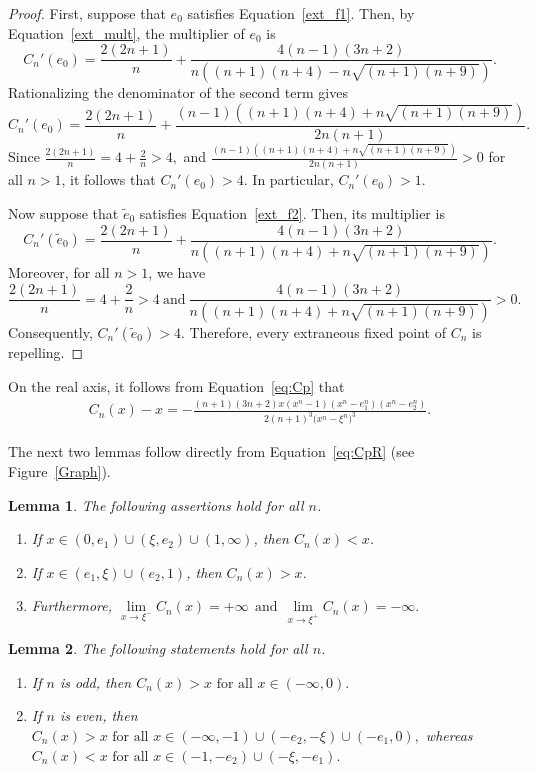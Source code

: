 \documentclass[12pt]{article}
\newtheorem{lem}{Lemma}[section]
\begin{document}
	\begin{proof}
		First, suppose that $e_0$ satisfies Equation~\eqref{ext_f1}.
		Then, by Equation~\eqref{ext_mult}, the multiplier of $e_0$ is $$C_n'(e_0)=\frac{2(2n+1)}{n}+\frac{4(n-1)(3n+2)}{n\left((n+1)(n+4)-n\sqrt{(n+1)(n+9)}\right)}.$$
		Rationalizing the denominator of the second term gives
		$$C_n'(e_0)=\frac{2(2n+1)}{n}+\frac{(n-1)\left((n+1)(n+4)+n\sqrt{(n+1)(n+9)}\right)}{2n(n+1)}.$$
		Since $\frac{2(2n+1)}{n}=4+\frac{2}{n}>4,$ and 	$\frac{(n-1)\left((n+1)(n+4)+n\sqrt{(n+1)(n+9)}\right)}{2n(n+1)}> 0$
		for all $n>1$, it follows that $C_n'(e_0)>4.$
		In particular, $C_n'(e_0)>1.$
		
		Now suppose that $\tilde{e}_0$ satisfies Equation~\eqref{ext_f2}.
		Then, its multiplier is
		$$C_n'(\tilde{e}_0)=\frac{2(2n+1)}{n}+\frac{4(n-1)(3n+2)}{n\left((n+1)(n+4)+n\sqrt{(n+1)(n+9)}\right)}.$$
		Moreover, for all $n>1$, we have
		$$\frac{2(2n+1)}{n}=4+\frac{2}{n}>4 ~\mbox{and}~
		 \frac{4(n-1)(3n+2)}{n\left((n+1)(n+4)+n\sqrt{(n+1)(n+9)}\right)}>0.$$
		Consequently, $C_n'(\tilde{e}_0)>4$.
		Therefore, every extraneous fixed point of $C_n$ is repelling.
	\end{proof}
 On the real axis, it follows from Equation~\eqref{eq:Cp} that
	\begin{align}
		C_n(x)-x =-\frac{(n+1)(3n+2)x(x^n-1)(x^n-e_1^n)(x^n-e_2^n)}{2(n+1)^3\big(x^n-\xi^n\big)^3}.
		\label{eq:CpR}
	\end{align}

The next two lemmas follow directly from Equation~\eqref{eq:CpR} (see Figure~\ref{Graph}). 
	
	\begin{lem}
		The following assertions hold for all $n$.
		\begin{enumerate}
			\item If $x \in (0,e_1)\cup(\xi,e_2) \cup(1, \infty)$, then $ C_n(x)<x$.
			\item If $x \in (e_1, \xi) \cup (e_2,1)$, then $ C_n(x)>x$.
			\item Furthermore, $\lim\limits_{x \to {\xi}^-}C_n(x)=+\infty  ~~\text{and}~~\lim\limits_{x \to {\xi}^+}C_n(x)=-\infty.$
		\end{enumerate}
		\label{C_p-real-all}
	\end{lem}   
	\begin{lem}
		The following statements hold for all $n$.
		\begin{enumerate}
			\item If $n$ is odd, then
			$ 
			C_n(x)>x \text{ for all } x\in(-\infty,0).
			$ 
			\item If $n$ is even, then
			 $C_n(x)>x \text{ for all } x\in(-\infty,-1)\cup(-e_2,-\xi)\cup(-e_1,0),$ 
			whereas
			 $C_n(x)<x \text{ for all } x\in(-1,-e_2)\cup(-\xi,-e_1).$ 
		\end{enumerate}
		\label{C_p-real-odd-even}
	\end{lem} 
	
\end{document}
